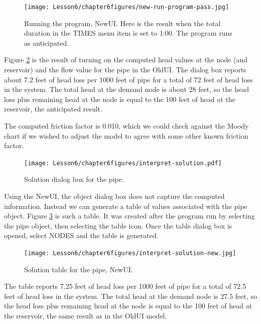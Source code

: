 \begin{figure}[h!] %
   \centering
   \texttt{[image: Lesson6/chapter6figures/new-run-program-pass.jpg]} 
   \caption{Running the program, NewUI.  Here is the result when the total duration in the TIMES menu item is set to 1:00.  The program runs as anticipated.}
   \label{fig:new-run-program-pass}
\end{figure}
\clearpage

Figure \ref{fig:interpret-solution} is the result of turning on the computed head values at the node (and reservoir) and the flow value for the pipe in the OldUI.  The dialog box reports about 7.2 feet of head loss per 1000 feet of pipe for a total of 72 feet of head loss in the system.   The total head at the demand node is about 28 feet, so the head loss plus remaining head at the node is equal to the 100 feet of head at the reservoir, the anticipated result.  

The computed friction factor is 0.010, which we could check against the Moody chart if we wished to adjust the model to agree with some other known friction factor.   
\begin{figure}[h!] %
   \centering
   \texttt{[image: Lesson6/chapter6figures/interpret-solution.pdf]} 
   \caption{Solution dialog box for the pipe.}
   \label{fig:interpret-solution}
\end{figure}

Using the NewUI, the object dialog box does not capture the computed information.  
Instead we can generate a table of values associated with the pipe object.
Figure \ref{fig:interpret-solution-new} is such a table.
It was created after the program run by selecting the pipe object, then selecting the table icon.
Once the table dialog box is opened, select NODES and the table is generated.

\begin{figure}[h!] %
   \centering
   \texttt{[image: Lesson6/chapter6figures/interpret-solution-new.jpg]} 
   \caption{Solution table for the pipe, NewUI.}
   \label{fig:interpret-solution-new}
\end{figure}

The table reports 7.25 feet of head loss per 1000 feet of pipe for a total of 72.5 feet of head loss in the system.   The total head at the demand node is 27.5 feet, so the head loss plus remaining head at the node is equal to the 100 feet of head at the reservoir, the same result as in the OldUI model.

